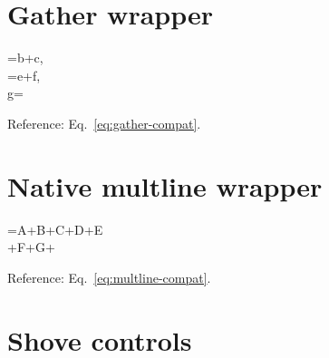 \documentclass[twocolumn]{article}
\begin{document}
\section*{Gather wrapper}
\begin{annotatedgather}[numbered]
=b+c,\\
=e+f,\\
g=
\label{eq:gather-compat}
\end{annotatedgather}
Reference: Eq.~\ref{eq:gather-compat}.

\section*{Native multline wrapper}
\begin{annotatedmultline}[numbered]
=A+B+C+D+E\\
{}+F+G+
\label{eq:multline-compat}
\end{annotatedmultline}
Reference: Eq.~\ref{eq:multline-compat}.

\section*{Shove controls}
\begin{annotatedmultline}
\\
\end{annotatedmultline}
\end{document}
